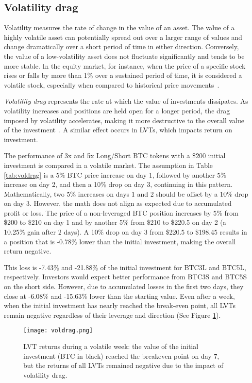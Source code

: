 \subsection{Volatility drag}\label{appx:voldrag}
Volatility measures the rate of change in the value of an asset. The value of a highly volatile asset can potentially spread out over a larger range of values and change dramatically over a short period of time in either direction. Conversely, the value of a low-volatility asset does not fluctuate significantly and tends to be more stable. In the equity market, for instance, when the price of a specific stock rises or falls by more than 1\% over a sustained period of time, it is considered a volatile stock, especially when compared to historical price movements~\cite{Investo_Volatility}.

\textsl{Volatility drag} represents the rate at which the value of investments dissipates. As volatility increases and positions are held open for a longer period, the drag imposed by volatility accelerates, making it more destructive to the overall value of the investment~\cite{tsalikis2019can, SeekingAlpha_Volatility}. A similar effect occurs in LVTs, which impacts return on investment.


\begin{example}
	The performance of 3x and 5x Long/Short BTC tokens with a \$200 initial investment is compared in a volatile market. The assumption in Table \ref{tab:voldrag} is a 5\% BTC price increase on day 1, followed by another 5\% increase on day 2, and then a 10\% drop on day 3, continuing in this pattern. Mathematically, two 5\% increases on days 1 and 2 should be offset by a 10\% drop on day 3. However, the math does not align as expected due to accumulated profit or loss. The price of a non-leveraged BTC position increases by 5\% from \$200 to \$210 on day 1 and by another 5\% from \$210 to \$220.5 on day 2 (a 10.25\% gain after 2 days). A 10\% drop on day 3 from \$220.5 to \$198.45 results in a position that is -0.78\% lower than the initial investment, making the overall return negative. 
	
	This loss is -7.43\% and -21.88\% of the initial investment for BTC3L and BTC5L, respectively. Investors would expect better performance from BTC3S and BTC5S on the short side. However, due to accumulated losses in the first two days, they close at -6.08\% and -15.63\% lower than the starting value. Even after a week, when the initial investment has nearly reached the break-even point, all LVTs remain negative regardless of their leverage and direction (See Figure \ref{fig:voldrag}).
	
	\begin{figure}[t]
		\centering
		\texttt{[image: voldrag.png]}
		\caption{LVT returns during a volatile week: the value of the initial investment (BTC in black) reached the breakeven point on day 7, but the returns of all LVTs remained negative due to the impact of volatility drag.}
		\label{fig:voldrag}
	\end{figure}
\end{example}

